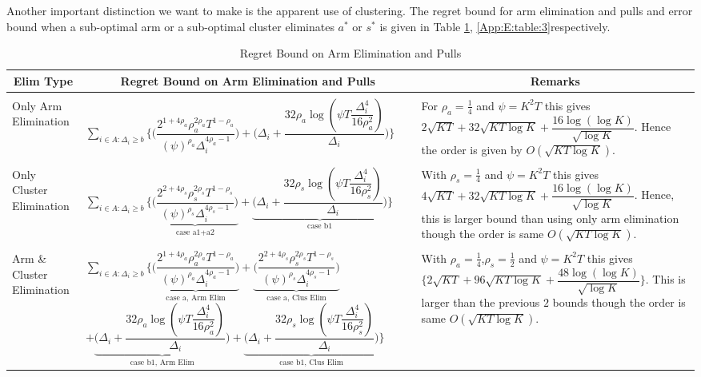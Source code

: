 \begin{remark}
\label{App:E:Rem:1}
Another important distinction we want to make is the apparent use of clustering. The regret bound for arm elimination and pulls and error bound when a sub-optimal arm or a sub-optimal cluster eliminates $a^{*}$ or $s^{*}$ is given in Table \ref{App:E:table:2}, \ref{App:E:table:3}respectively.
 
\begin{table}
\caption{Regret Bound on Arm Elimination and Pulls}
\label{App:E:table:2}
\begin{center}
\begin{tabular}{p{1.4cm}p{10.2cm}p{3.5cm}}
\multicolumn{1}{c}{\bf Elim Type} &\multicolumn{1}{c}{\bf Regret Bound on Arm Elimination and Pulls} &\multicolumn{1}{c}{\bf Remarks} \\
\hline \\
Only Arm Elimination 	&$\sum_{i\in A:\Delta_{i}\geq b}\bigg\lbrace\bigg(\dfrac{2^{1+4\rho_{a}}\rho_{a}^{2\rho_{a}}T^{1-\rho_{a}}}{(\psi)^{\rho_{a}}\Delta_{i}^{4\rho_{a}-1}}\bigg) + \bigg(\Delta_{i}+ \dfrac{32\rho_{a}\log{(\psi  T\dfrac{\Delta_{i}^{4}}{16\rho_{a}^{2}})}}{\Delta_{i}}\bigg)\bigg\rbrace$ & For $\rho_{a}=\frac{1}{4}$ and $\psi=K^{2}T$ this gives $ 2\sqrt{KT} + 32\sqrt{KT\log K} + \dfrac{16\log(\log K)}{\sqrt{\log K}}$. Hence the order is given by $O(\sqrt{KT\log K})$.\\
\hline\\
Only Cluster Elimination	&$ \sum_{i\in A:\Delta_{i}\geq b}\bigg\lbrace\underbrace{\bigg(\dfrac{2^{2+4\rho_{s}}\rho_{s}^{2\rho_{s}}T^{1-\rho_{s}}}{(\psi)^{\rho_{s}}\Delta_{i}^{4\rho_{s}-1}}\bigg)}_{\text{case a1+a2}} +  \underbrace{\bigg(\Delta_{i} +\dfrac{32\rho_{s}\log{(\psi T\dfrac{\Delta_{i}^{4}}{16\rho_{s}^{2}})}}{\Delta_{i}}\bigg)}_{\text{case b1}}\bigg\rbrace$ & With $\rho_{s}=\frac{1}{4}$ and  $\psi=K^{2}T$ this gives $ 4\sqrt{KT} + 32\sqrt{KT\log K} + \dfrac{16\log(\log K)}{\sqrt{\log K}}$. Hence, this is larger bound than using only arm elimination though the order is same $O(\sqrt{KT\log K})$.\\
\hline\\
Arm \& Cluster Elimination 	&$\sum_{i\in A:\Delta_{i}\geq b} \bigg\lbrace \underbrace{\bigg(\dfrac{2^{1+4\rho_{a}}\rho_{a}^{2\rho_{a}}T^{1-\rho_{a}}}{(\psi)^{\rho_{a}}\Delta_{i}^{4\rho_{a}-1}}\bigg)}_{\text{case a, Arm Elim}} + \underbrace{\bigg(\dfrac{2^{2+4\rho_{s}}\rho_{s}^{2\rho_{s}}T^{1-\rho_{s}}}{(\psi)^{\rho_{s}}\Delta_{i}^{4\rho_{s}-1}}\bigg)}_{\text{case a, Clus Elim}} $   $+ \underbrace{\bigg(\Delta_{i}+\dfrac{32\rho_{a}\log{(\psi T\dfrac{\Delta_{i}^{4}}{16\rho_{a}^{2}})}}{\Delta_{i}}\bigg)}_{\text{case b1, Arm Elim}} +\underbrace{\bigg(\Delta_{i}+\dfrac{32\rho_{s}\log{(\psi T\dfrac{\Delta_{i}^{4}}{16\rho_{s}^{2}})}}{\Delta_{i}}\bigg)}_{\text{case b1, Clus Elim}}\bigg\rbrace$ & With $\rho_{a}=\frac{1}{4}$,$\rho_{s}=\frac{1}{2}$ and $\psi=K^{2}T$ this gives $\bigg\lbrace 2\sqrt{KT} + 96\sqrt{KT\log K} + \dfrac{48\log(\log K)}{\sqrt{\log K}} \bigg\rbrace$. This is larger than the previous $2$ bounds though the order is same $O(\sqrt{KT\log K})$.

\end{tabular}
\end{center}
\end{table}
\end{remark}
